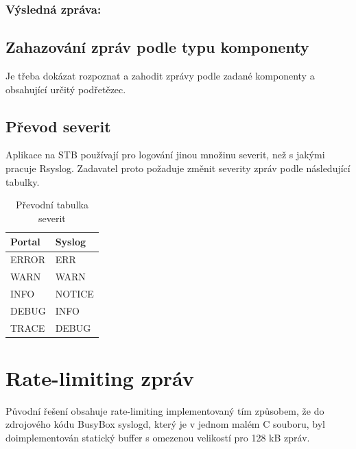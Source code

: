 \documentclass[thesis=B,czech]{FITthesis}[2012/06/26]
\begin{document}
\subsubsection*{Výsledná zpráva:}
\begin{scriptsize}
\begin{verbatim}
2016-02-18T14:05:24+01:00 cc-b8-f1-00-6f-07 sld_br: id=559
[94mDEBUG: InformationService: Reading 'nangu.video.forcedScart':
false[0m
\end{verbatim}}
\end{scriptsize}

\subsection{Zahazování zpráv podle typu komponenty}
Je třeba dokázat rozpoznat a zahodit zprávy podle zadané komponenty a obsahující určitý podřetězec.

\subsection{Převod severit}
Aplikace na STB používají pro logování jinou množinu severit, než s jakými pracuje Rsyslog. Zadavatel proto požaduje změnit severity zpráv podle následující tabulky.

\begin{table}[ht]
\centering
	\caption{Převodní tabulka severit}	\begin{tabular}{|l|l|}\hline
		Portal		& Syslog			\tabularnewline \hline \hline
		ERROR		& ERR			\tabularnewline \hline
		WARN		& WARN			\tabularnewline \hline
		INFO		& NOTICE			\tabularnewline \hline
		DEBUG		& INFO			\tabularnewline \hline
		TRACE		& DEBUG			\tabularnewline \hline
	\end{tabular}
\end{table}

\section{Rate-limiting zpráv}
Původní řešení obsahuje rate-limiting implementovaný tím způsobem, že do zdrojového kódu BusyBox syslogd, který je v jednom malém C souboru, byl doimplementován statický buffer s omezenou velikostí pro 128 kB zpráv.
\end{document}
